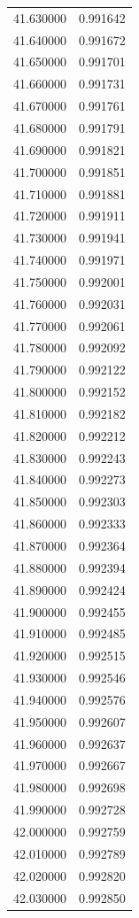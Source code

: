 \begin{tabular}{rr}
41.630000 & 0.991642 \\
41.640000 & 0.991672 \\
41.650000 & 0.991701 \\
41.660000 & 0.991731 \\
41.670000 & 0.991761 \\
41.680000 & 0.991791 \\
41.690000 & 0.991821 \\
41.700000 & 0.991851 \\
41.710000 & 0.991881 \\
41.720000 & 0.991911 \\
41.730000 & 0.991941 \\
41.740000 & 0.991971 \\
41.750000 & 0.992001 \\
41.760000 & 0.992031 \\
41.770000 & 0.992061 \\
41.780000 & 0.992092 \\
41.790000 & 0.992122 \\
41.800000 & 0.992152 \\
41.810000 & 0.992182 \\
41.820000 & 0.992212 \\
41.830000 & 0.992243 \\
41.840000 & 0.992273 \\
41.850000 & 0.992303 \\
41.860000 & 0.992333 \\
41.870000 & 0.992364 \\
41.880000 & 0.992394 \\
41.890000 & 0.992424 \\
41.900000 & 0.992455 \\
41.910000 & 0.992485 \\
41.920000 & 0.992515 \\
41.930000 & 0.992546 \\
41.940000 & 0.992576 \\
41.950000 & 0.992607 \\
41.960000 & 0.992637 \\
41.970000 & 0.992667 \\
41.980000 & 0.992698 \\
41.990000 & 0.992728 \\
42.000000 & 0.992759 \\
42.010000 & 0.992789 \\
42.020000 & 0.992820 \\
42.030000 & 0.992850 \\

\end{tabular}
